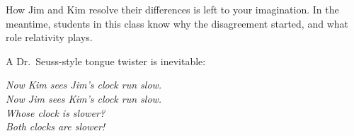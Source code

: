 \documentclass{../../oss-handout}
\begin{document}
How Jim and Kim resolve their differences is left to your imagination. In the
meantime, students in this class know why the disagreement started, and what
role relativity plays.

\vspace{.3in}A Dr.\ Seuss-style tongue twister is inevitable:
\begin{center}
  \begin{minipage}{.4\linewidth}
    \emph{Now Kim sees Jim's clock run slow.\\
      Now Jim sees Kim's clock run slow.\\
      Whose clock is slower?\\
      Both clocks are slower!
    }
  \end{minipage}
\end{center}
  
\end{document}
